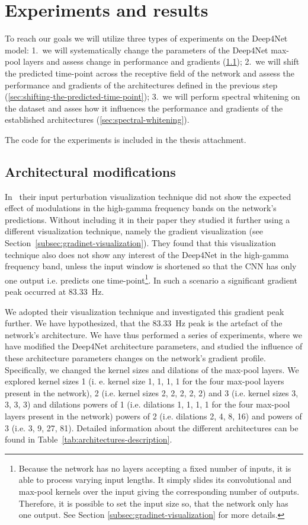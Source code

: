 \chapter{Experiments and results}
\label{ch:exp}

To reach our goals we will utilize three types of experiments on the Deep4Net model:
1.~we will systematically change the parameters of the Deep4Net max-pool layers and assess change in performance and gradients (\ref{sec:architectural-modifications}); 2.~we will shift the predicted time-point across the receptive field of the network and assess the performance and gradients of the architectures defined in the previous step (\ref{sec:shifting-the-predicted-time-point}); 3.~we will perform spectral whitening on the dataset and asses how it influences the performance and gradients of the established architectures (\ref{sec:spectral-whitening}). 

The code for the experiments is included in the thesis attachment. 

\section{Architectural modifications}\label{sec:architectural-modifications}
In~\cite{Hammer-2021} their input perturbation visualization technique did not show the expected effect of modulations in the high-gamma frequency bands on the network's predictions.
Without including it in their paper they studied it further using a different visualization technique, namely the gradient visualization (see Section~\ref{subsec:gradinet-visualization}). 
They found that this visualization technique also does not show any interest of the Deep4Net in the high-gamma frequency band, unless the input window is shortened so that the CNN has only one output i.e. predicts one time-point\footnote{Because the network has no layers accepting a fixed number of inputs, it is able to process varying input lengths. It simply slides its convolutional and max-pool kernels over the input giving the corresponding number of outputs. Therefore, it is possible to set the input size so, that the network only has one output. See Section \ref{subsec:gradinet-visualization} for more details.}.
In such a scenario a significant gradient peak occurred at 83.33~Hz.


We adopted their visualization technique and investigated this gradient peak further. We have hypothesized, that the 83.33~Hz peak is the artefact of the network's architecture. We have thus 
performed a series of experiments, where we have modified the Deep4Net architecture parameters, and 
studied the influence of these architecture parameters changes on the network's gradient profile.
Specifically, we changed the kernel sizes and dilations of the max-pool layers. We explored kernel sizes 1 (i. e. kernel size 1, 1, 1, 1 for the four max-pool layers present in the network), 2 (i.e. kernel sizes 2, 2, 2, 2, 2) and 3 (i.e. kernel sizes 3, 3, 3, 3) and dilations powers of 1 (i.e. dilations 1, 1, 1, 1  for the four max-pool layers present in the network) powers of 2 (i.e. dilations 2, 4, 8, 16) and powers of 3 (i.e. 3, 9, 27, 81). Detailed information about the different architectures can be found in Table~\ref{tab:architectures-description}.

